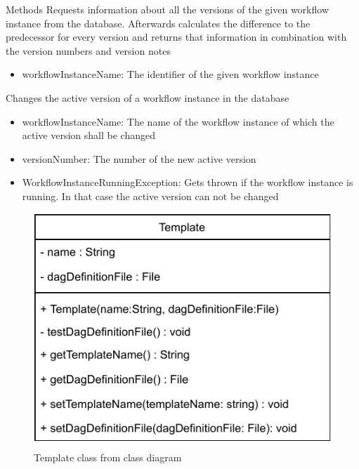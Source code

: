 \begin{methodenv}{Methods}
Requests information about all the versions of the given workflow instance from the database. Afterwards calculates the difference to the predecessor for every version and returns that information in combination with the version numbers and version notes

\begin{itemize}
	\item{workflowInstanceName:}
	The identifier of the given workflow instance
\end{itemize}

Changes the active version of a workflow instance in the database

\begin{itemize}
	\item{workflowInstanceName:}
	The name of the workflow instance of which the active version shall be changed
	\item{versionNumber:}
	The number of the new active version
\end{itemize}

\begin{itemize}
	\item{WorkflowInstanceRunningException:}
	Gets thrown if the workflow instance is running. In that case the active version can not be changed
\end{itemize}
\end{methodenv}


\begin{figure}[h]
\centerline{\includegraphics[scale=1]{res/Klassen/Template.pdf}}
\caption{Template class from class diagram}
\end{figure}

